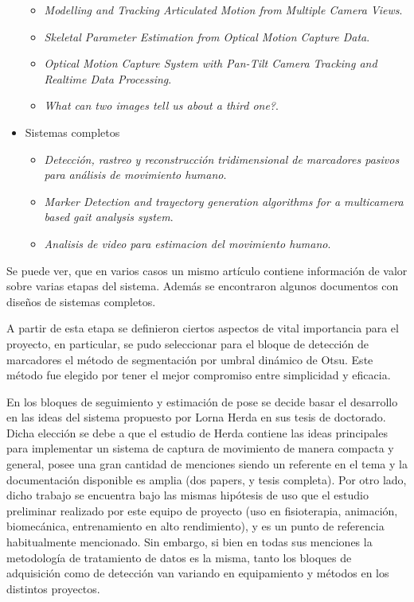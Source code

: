 \begin{itemize}
\begin{itemize}
		\item \emph{Modelling and Tracking Articulated Motion from Multiple Camera Views}.
		\item \emph{Skeletal Parameter Estimation from Optical Motion Capture Data}.
		\item \emph{Optical Motion Capture System with Pan-Tilt Camera Tracking and  Realtime Data Processing}.
		\item \emph{What can two images tell us about a third one?}.
	\end{itemize}
	\item Sistemas completos
	\begin{itemize}
		\item \emph{Detección, rastreo y reconstrucción tridimensional de marcadores pasivos para análisis de movimiento humano}.
		\item \emph{Marker Detection and trayectory generation algorithms for a multicamera based gait analysis system}.
		\item \emph{Analisis de video para estimacion del movimiento humano}.
	\end{itemize}
\end{itemize}

Se puede ver, que en varios casos un mismo artículo contiene información de valor sobre varias etapas del sistema. Además se encontraron algunos documentos con diseños de sistemas completos.

A partir de esta etapa se definieron ciertos aspectos de vital importancia para el proyecto, en particular, se pudo seleccionar para el bloque de detección de marcadores el método de segmentación por umbral dinámico de Otsu\cite{otsu}. Este método fue elegido por tener el mejor compromiso entre simplicidad y eficacia.

En los bloques de seguimiento y estimación de pose se decide basar el desarrollo en las ideas del sistema propuesto por Lorna Herda en sus tesis de doctorado\cite{herda}. Dicha elección se debe a que el estudio de Herda contiene las ideas principales para implementar un sistema de captura de movimiento de manera compacta y general, posee una gran cantidad de menciones siendo un referente en el tema y la documentación disponible es amplia (dos papers, y tesis completa). Por otro lado, dicho trabajo se encuentra bajo las mismas hipótesis de uso que el estudio preliminar realizado por este equipo de proyecto (uso en fisioterapia, animación, biomecánica, entrenamiento en alto rendimiento), y es un punto de referencia habitualmente mencionado. Sin embargo, si bien en todas sus menciones la metodología de tratamiento de datos es la misma, tanto los bloques de adquisición como de detección van variando en equipamiento y métodos en los distintos proyectos.